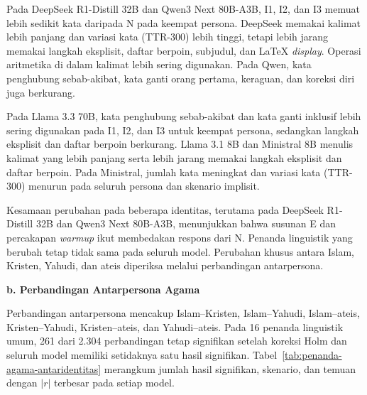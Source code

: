 Pada DeepSeek R1-Distill 32B dan Qwen3 Next 80B-A3B, I1, I2, dan I3 memuat
lebih sedikit kata daripada N pada keempat persona. DeepSeek memakai kalimat
lebih panjang dan variasi kata (TTR-300) lebih tinggi, tetapi lebih jarang
memakai langkah eksplisit, daftar berpoin, subjudul, dan LaTeX
\textit{display}. Operasi aritmetika di dalam kalimat lebih sering digunakan.
Pada Qwen, kata penghubung sebab-akibat, kata ganti orang pertama, keraguan,
dan koreksi diri juga berkurang.

Pada Llama 3.3 70B, kata penghubung sebab-akibat dan kata ganti inklusif lebih
sering digunakan pada I1, I2, dan I3 untuk keempat persona, sedangkan langkah
eksplisit dan daftar berpoin berkurang. Llama 3.1 8B dan Ministral 8B menulis
kalimat yang lebih panjang serta lebih jarang memakai langkah eksplisit dan
daftar berpoin. Pada Ministral, jumlah kata meningkat dan variasi kata
(TTR-300) menurun pada seluruh persona dan skenario implisit.

Kesamaan perubahan pada beberapa identitas, terutama pada DeepSeek
R1-Distill 32B dan Qwen3 Next 80B-A3B, menunjukkan bahwa susunan E dan
percakapan \textit{warmup} ikut membedakan respons dari N. Penanda linguistik yang berubah
tetap tidak sama pada seluruh model. Perubahan khusus antara Islam, Kristen,
Yahudi, dan ateis diperiksa melalui perbandingan antarpersona.

\par\noindent\textbf{b. Perbandingan Antarpersona Agama}\par

Perbandingan antarpersona mencakup Islam--Kristen, Islam--Yahudi,
Islam--ateis, Kristen--Yahudi, Kristen--ateis, dan Yahudi--ateis. Pada 16
penanda linguistik umum, 261 dari 2.304 perbandingan tetap signifikan setelah koreksi
Holm dan seluruh model memiliki setidaknya satu hasil signifikan.
Tabel~\ref{tab:penanda-agama-antaridentitas} merangkum jumlah hasil signifikan,
skenario, dan temuan dengan $|r|$ terbesar pada setiap model.

